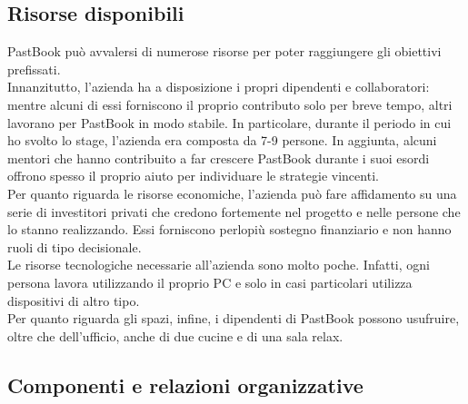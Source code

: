 		\subsection{Risorse disponibili}
			PastBook può avvalersi di numerose risorse per poter raggiungere gli obiettivi prefissati.\\
			Innanzitutto, l'azienda ha a disposizione i propri dipendenti e collaboratori: mentre alcuni di essi forniscono il proprio
			contributo solo per breve tempo, altri lavorano per PastBook in modo stabile. In particolare, durante il periodo in cui ho
			svolto lo stage, l'azienda era composta da 7-9 persone. In aggiunta, alcuni mentori che hanno contribuito a far crescere
			PastBook durante i suoi esordi offrono spesso il proprio aiuto per individuare le strategie vincenti.\\
			Per quanto riguarda le risorse economiche, l'azienda può fare affidamento su una serie di investitori privati che credono
			fortemente nel progetto e nelle persone che lo stanno realizzando. Essi forniscono perlopiù sostegno finanziario e non hanno
			ruoli di tipo decisionale.\\
			Le risorse tecnologiche necessarie all'azienda sono molto poche. Infatti, ogni persona lavora utilizzando il proprio PC e
			solo in casi particolari utilizza dispositivi di altro tipo.\\
			Per quanto riguarda gli spazi, infine, i dipendenti di PastBook possono usufruire, oltre che dell'ufficio, anche di due
			cucine e di una sala relax.
		\subsection{Componenti e relazioni organizzative}
